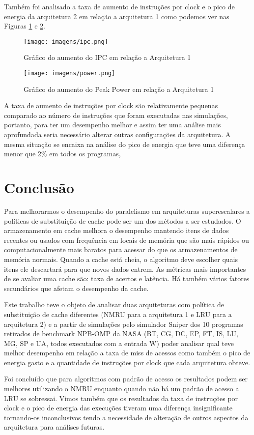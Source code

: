 \documentclass[12pt]{article}
\begin{document}
Também foi analisado a taxa de aumento de instruções por clock e o pico de energia da arquitetura 2 em relação a arquitetura 1 como podemos ver nas Figuras \ref{fig:figura5} e \ref{fig:figura6}.

\begin{figure}[H]
\centering
\texttt{[image: imagens/ipc.png]}
\caption{Gráfico do aumento do IPC em relação a Arquitetura 1}
\label{fig:figura5}
\end{figure}

\begin{figure}[H]
\centering
\texttt{[image: imagens/power.png]}
\caption{Gráfico do aumento do Peak Power em relação a Arquitetura 1}
\label{fig:figura6}
\end{figure}

A taxa de aumento de instruções por clock são relativamente pequenas comparado ao número de instruções que foram executadas nas simulações, portanto, para ter um desempenho melhor e assim ter uma análise mais aprofundada seria necessário alterar outras configurações da arquitetura. A mesma situação se encaixa na análise do pico de energia que teve uma diferença menor que 2\% em todos os programas,

\section{Conclusão}  \label{sec:conc}

Para melhorarmos o desempenho do paralelismo em arquiteturas superescalares a políticas de substituição de cache pode ser um dos métodos a ser estudados. O armazenamento em cache melhora o desempenho mantendo itens de dados recentes ou usados com frequência em locais de memória que são mais rápidos ou computacionalmente mais baratos para acessar do que os armazenamentos de memória normais. Quando a cache está cheia, o algoritmo deve escolher quais itens ele descartará para que novos dados entrem. As métricas mais importantes de se avaliar uma cache são: taxa de acertos e latência. Há também vários fatores secundários que afetam o desempenho da cache. \cite{ALAN}

Este trabalho teve o objeto de analisar duas arquiteturas com política de substituição de cache diferentes (NMRU para a arquitetura 1 e LRU para a arquitetura 2) e a partir de simulações pelo simulador Sniper dos 10 programas retirados de benchmark NPB-OMP da NASA (BT, CG, DC, EP, FT, IS, LU, MG, SP e UA, todos executados com a entrada W) poder analisar qual teve melhor desempenho em relação a taxa de miss de acessos como também o pico de energia gasto e a quantidade de instruções por clock que cada arquitetura obteve.

Foi concluído que para algoritmos com padrão de acesso os resultados podem ser melhores utilizando o NMRU enquanto quando não há um padrão de acesso a LRU se sobressai. Vimos também que os resultados da taxa de instruções por clock e o pico de energia das execuções tiveram uma diferença insignificante tornando-os inconclusivos tendo a necessidade de alteração de outros aspectos da arquitetura para análises futuras.



\end{document}
